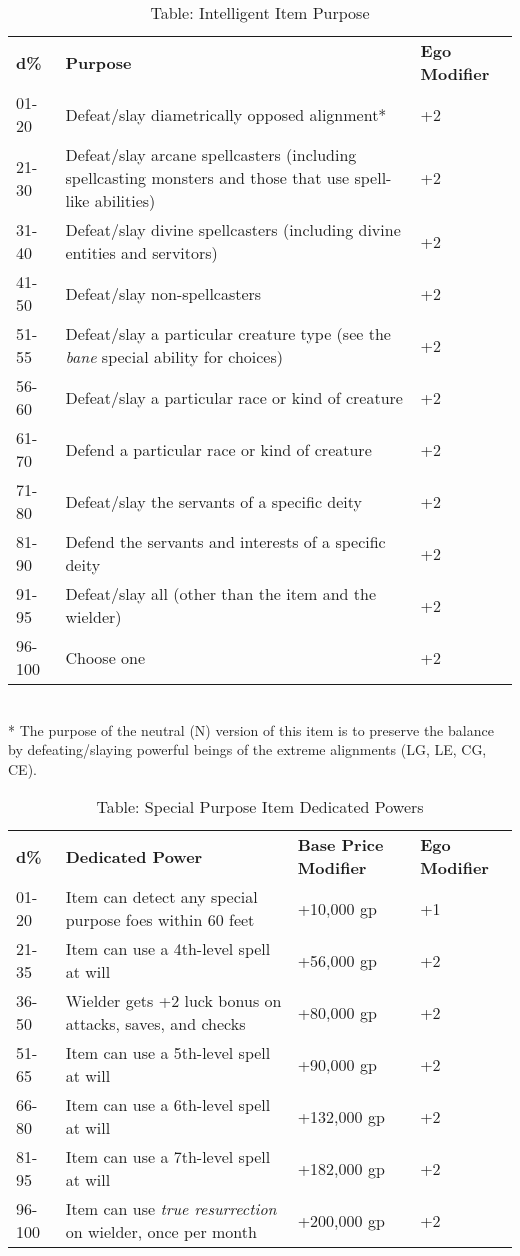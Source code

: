 \begin{table*}[]
\sffamily
\caption{Table: Intelligent Item Purpose}
\begin{tabularx}{\linewidth}{lXl}
\textbf{d\%} & \textbf{Purpose} & \textbf{Ego Modifier}\\
01-20 & Defeat/slay diametrically opposed alignment* & +2 \\
 21-30 & Defeat/slay arcane spellcasters (including spellcasting monsters and those that use spell-like abilities) & +2 \\
 31-40 & Defeat/slay divine spellcasters (including divine entities and servitors) & +2 \\
 41-50 & Defeat/slay non-spellcasters & +2 \\
 51-55 & Defeat/slay a particular creature type (see the \textit{bane} special ability for choices)  & +2 \\
 56-60 & Defeat/slay a particular race or kind of creature & +2 \\
 61-70 & Defend a particular race or kind of creature & +2 \\
 71-80 & Defeat/slay the servants of a specific deity & +2 \\
 81-90 & Defend the servants and interests of a specific deity & +2 \\
 91-95 & Defeat/slay all (other than the item and the wielder) & +2 \\
 96-100 & Choose one & +2\\
\end{tabularx}\\
* The purpose of the neutral (N) version of this item is to preserve the balance by defeating/slaying powerful beings of the extreme alignments (LG, LE, CG, CE).\\
\end{table*}
\begin{table*}[]
\sffamily
\caption{Table: Special Purpose Item Dedicated Powers}
\begin{tabularx}{\linewidth}{lXll}
\textbf{d\%} & \textbf{Dedicated Power} & \textbf{Base Price Modifier} & \textbf{Ego Modifier}\\
01-20 & Item can detect any special purpose foes within 60 feet & +10,000 gp & +1 \\
 21-35 & Item can use a 4th-level spell at will & +56,000 gp & +2 \\
 36-50 & Wielder gets +2 luck bonus on attacks, saves, and checks & +80,000 gp & +2 \\
 51-65 & Item can use a 5th-level spell at will & +90,000 gp & +2 \\
 66-80 & Item can use a 6th-level spell at will & +132,000 gp & +2 \\
 81-95 & Item can use a 7th-level spell at will & +182,000 gp & +2 \\
 96-100 & Item can use \textit{true resurrection }on wielder, once per month  & +200,000 gp & +2\\
\end{tabularx}
\end{table*}

